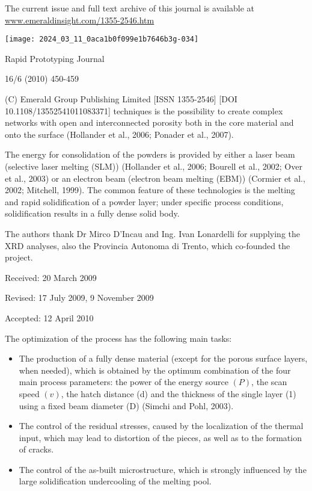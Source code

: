 \documentclass[10pt]{article}
\begin{document}
The current issue and full text archive of this journal is available at \href{http://www.emeraldinsight.com/1355-2546.htm}{www.emeraldinsight.com/1355-2546.htm}

\begin{center}
\texttt{[image: 2024\_03\_11\_0aca1b0f099e1b7646b3g-034]}
\end{center}

Rapid Prototyping Journal

16/6 (2010) 450-459

(C) Emerald Group Publishing Limited [ISSN 1355-2546] [DOI 10.1108/13552541011083371] techniques is the possibility to create complex networks with open and interconnected porosity both in the core material and onto the surface (Hollander et al., 2006; Ponader et al., 2007).

The energy for consolidation of the powders is provided by either a laser beam (selective laser melting (SLM)) (Hollander et al., 2006; Bourell et al., 2002; Over et al., 2003) or an electron beam (electron beam melting (EBM)) (Cormier et al., 2002; Mitchell, 1999). The common feature of these technologies is the melting and rapid solidification of a powder layer; under specific process conditions, solidification results in a fully dense solid body.

The authors thank Dr Mirco D'Incau and Ing. Ivan Lonardelli for supplying the XRD analyses, also the Provincia Autonoma di Trento, which co-founded the project.

Received: 20 March 2009

Revised: 17 July 2009, 9 November 2009

Accepted: 12 April 2010

The optimization of the process has the following main tasks:

\begin{itemize}
  \item The production of a fully dense material (except for the porous surface layers, when needed), which is obtained by the optimum combination of the four main process parameters: the power of the energy source $(P)$, the scan speed $(v)$, the hatch distance (d) and the thickness of the single layer (1) using a fixed beam diameter (D) (Simchi and Pohl, 2003).

  \item The control of the residual stresses, caused by the localization of the thermal input, which may lead to distortion of the pieces, as well as to the formation of cracks.

  \item The control of the as-built microstructure, which is strongly influenced by the large solidification undercooling of the melting pool.

\end{itemize}
\end{document}
